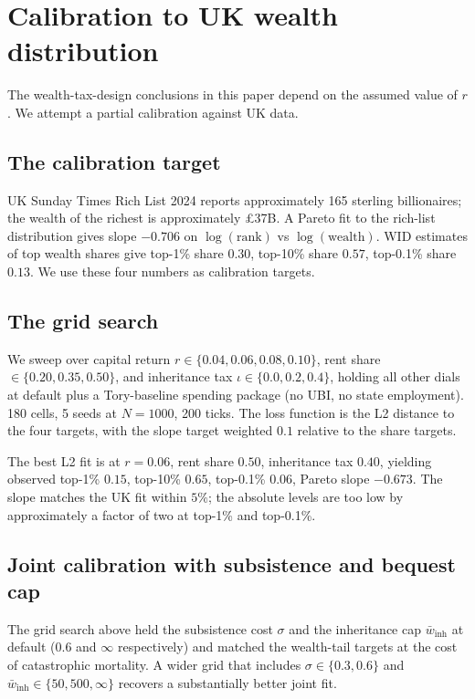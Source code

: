\documentclass[11pt]{article}
\begin{document}
\section{Calibration to UK wealth distribution}
\label{sec:calibration}

The wealth-tax-design conclusions in this paper depend on the
assumed value of $r$.  We attempt a partial calibration against UK
data.

\subsection{The calibration target}

UK Sunday Times Rich List 2024 reports approximately 165 sterling
billionaires; the wealth of the richest is approximately
\pounds 37B.  A Pareto fit to the rich-list distribution gives slope
$-0.706$ on $\log(\text{rank})$ vs $\log(\text{wealth})$.  WID
estimates of top wealth shares \citep{saez2016wealth} give
top-1\% share $0.30$, top-10\% share $0.57$, top-0.1\% share
$0.13$.  We use these four numbers as calibration targets.

\subsection{The grid search}

We sweep over capital return $r \in \{0.04, 0.06, 0.08, 0.10\}$,
rent share $\in \{0.20, 0.35, 0.50\}$, and inheritance tax
$\iota \in \{0.0, 0.2, 0.4\}$, holding all other dials at default
plus a Tory-baseline spending package (no UBI, no state employment).
180 cells, 5 seeds at $N = 1000$, 200 ticks.  The loss function is
the L2 distance to the four targets, with the slope target weighted
$0.1$ relative to the share targets.

The best L2 fit is at $r = 0.06$, rent share $0.50$, inheritance
tax $0.40$, yielding observed top-1\% $0.15$, top-10\% $0.65$,
top-0.1\% $0.06$, Pareto slope $-0.673$.  The slope matches the UK
fit within $5\%$; the absolute levels are too low by approximately
a factor of two at top-1\% and top-0.1\%.

\subsection{Joint calibration with subsistence and bequest cap}
\label{sec:joint-cal}

The grid search above held the subsistence cost $\sigma$ and the
inheritance cap $\bar{w}_\text{inh}$ at default ($0.6$ and
$\infty$ respectively) and matched the wealth-tail targets at the
cost of catastrophic mortality.  A wider grid that includes
$\sigma \in \{0.3, 0.6\}$ and $\bar{w}_\text{inh} \in \{50, 500,
\infty\}$ recovers a substantially better joint fit.
\end{document}
